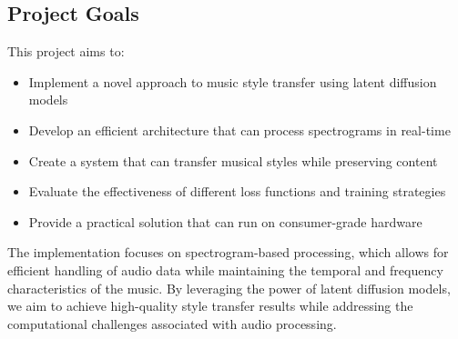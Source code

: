 \subsection{Project Goals}
This project aims to:
\begin{itemize}
    \item Implement a novel approach to music style transfer using latent diffusion models
    \item Develop an efficient architecture that can process spectrograms in real-time
    \item Create a system that can transfer musical styles while preserving content
    \item Evaluate the effectiveness of different loss functions and training strategies
    \item Provide a practical solution that can run on consumer-grade hardware
\end{itemize}

The implementation focuses on spectrogram-based processing, which allows for efficient handling of audio data while maintaining the temporal and frequency characteristics of the music. By leveraging the power of latent diffusion models, we aim to achieve high-quality style transfer results while addressing the computational challenges associated with audio processing. 
